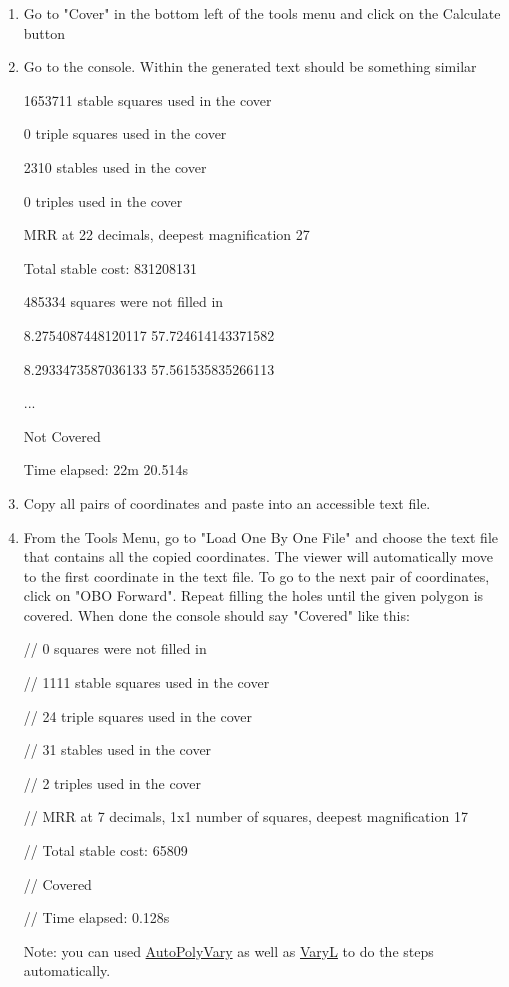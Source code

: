 \documentclass[11pt]{report}
\begin{document}
\begin{enumerate}[Step 1.]
  \item Go to "Cover" in the bottom left of the tools menu and click on the Calculate button
  \item Go to the console. Within the generated text should be something similar
  
  1653711 stable squares used in the cover

  0 triple squares used in the cover
  
  2310 stables used in the cover
  
  0 triples used in the cover
  
  MRR at 22 decimals, deepest magnification 27
  
  Total stable cost: 831208131
  
  485334 squares were not filled in
  
  8.2754087448120117 57.724614143371582
  
  8.2933473587036133 57.561535835266113
  
  ...
  
  Not Covered
  
  Time elapsed: 22m 20.514s
  \item Copy all pairs of coordinates and paste into an accessible text file.
  \item From the Tools Menu, go to "Load One By One File" and choose the text file that contains all the copied
  coordinates. The viewer will automatically move to the first coordinate in the text file.
  To go to the next pair of coordinates, click on "OBO Forward". Repeat filling the holes until the given
  polygon is covered.
  When done the console should say "Covered" like this:

  // 0 squares were not filled in

  // 1111 stable squares used in the cover

  // 24 triple squares used in the cover

  // 31 stables used in the cover

  // 2 triples used in the cover

  // MRR at 7 decimals, 1x1 number of squares, deepest magnification 17

  // Total stable cost: 65809

  // Covered

  // Time elapsed: 0.128s

  Note: you can used \hyperref[AutoPolyVary]{AutoPolyVary} as well as \hyperref[varyL]{VaryL} to do the steps automatically.
\end{enumerate}
\end{document}
